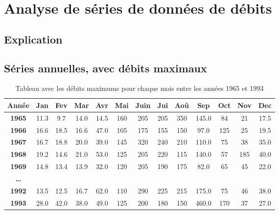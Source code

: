 \chapter{Analyse de séries de données de débits}

\section{Explication}

\section{Séries annuelles, avec débits maximaux}

\begin{table}[H]
    \centering
    \begin{tabular}{|c||c|c|c|c|c|c|c|c|c|c|c|c|}
        \hline
        \textbf{Année} & \textbf{Jan} & \textbf{Fev} & \textbf{Mar} & \textbf{Avr} & \textbf{Mai} & \textbf{Juin} & \textbf{Jui} & \textbf{Aoû} & \textbf{Sep} & \textbf{Oct} & \textbf{Nov} & \textbf{Dec} \\
        \hline \hline
        \textbf{1965}  & 11.3 &  9.7 & 14.0 & 14.5 & 160 & 205 & 205 & \cellcolor{red}350 & 145.0 &  84 &  21 & 17.5 \\
        \hline
        \textbf{1966}  & 16.6 & 18.5 & 16.6 & 47.0 & 105 & \cellcolor{red}175 & 155 & 150 &  97.0 & 125 &  25 & 19.5 \\
        \hline
        \textbf{1967}  & 16.7 & 18.8 & 20.0 & 39.0 & 145 & \cellcolor{red}320 & 240 & 210 & 110.0 &  75 &  38 & 35.0 \\
        \hline
        \textbf{1968}  & 19.2 & 14.6 & 21.0 & 53.0 & 125 & 205 & \cellcolor{red}220 & 115 & 140.0 &  57 & 185 & 40.0 \\
        \hline
        \textbf{1969}  & 14.8 & 13.4 & 13.9 & 32.0 & 120 & \cellcolor{red}205 & 190 & 175 &  82.0 &  65 &  45 & 22.0 \\
        \hline
        \textbf{\dots} &      &      &      &      &     &     &     &     &       &     &     &      \\
        \hline
        \textbf{1992}  & 13.5 & 12.5 & 16.7 & 62.0 & 110 & \cellcolor{red}290 & 225 & 215 & 175.0 &  75 &  46 & 38.0 \\
        \hline
        \textbf{1993}  & 28.0 & 42.0 & 38.0 & 49.0 & 125 & 200 & 180 & 150 & \cellcolor{red}460.0 & 170 &  37 & 27.0 \\
        \hline
    \end{tabular}
    \caption{Tableau avec les débits maximums pour chaque mois entre les années 1965 et 1993}
    \label{tab:serieAnnuelleMaximum}
\end{table}

